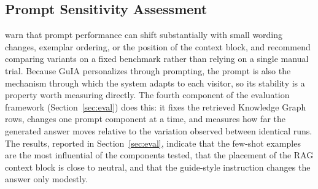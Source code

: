


\subsection{Prompt Sensitivity Assessment}

\citet{PromptSurvey2024} warn that prompt performance can shift substantially with small wording changes, exemplar ordering, or the position of the context block, and recommend comparing variants on a fixed benchmark rather than relying on a single manual trial. Because GuIA personalizes through prompting, the prompt is also the mechanism through which the system adapts to each visitor, so its stability is a property worth measuring directly. The fourth component of the evaluation framework (Section~\ref{sec:eval}) does this: it fixes the retrieved Knowledge Graph rows, changes one prompt component at a time, and measures how far the generated answer moves relative to the variation observed between identical runs. The results, reported in Section~\ref{sec:eval}, indicate that the few-shot examples are the most influential of the components tested, that the placement of the RAG context block is close to neutral, and that the guide-style instruction changes the answer only modestly.



